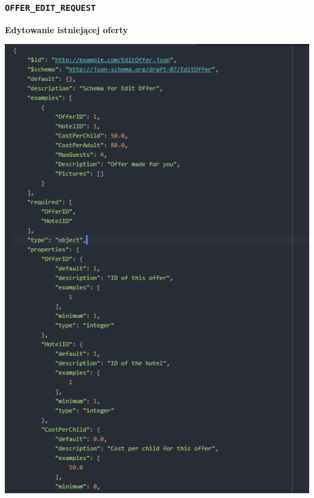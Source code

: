 \documentclass{article}
\begin{document}
\subsubsection{\texttt{OFFER\_EDIT\_REQUEST}}
\textbf{Edytowanie istniejącej oferty}\\
\begin{center}
    \includegraphics[scale=1.3]{Oferta-Hotel-Serwer/Offer_Edit_JSON1.png}

\end{center}
\end{document}
